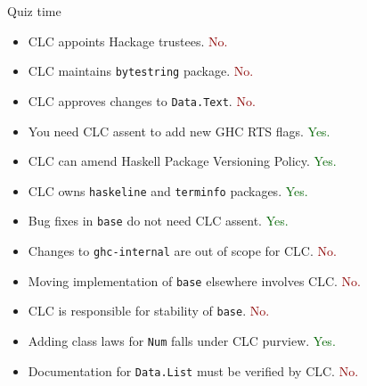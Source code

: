 \documentclass[handout]{beamer}
\begin{document}
\begin{frame}{Quiz time}

\begin{itemize}

\def\yes{\textcolor{darkgreen}{Yes.}}
\def\no{\textcolor{darkred}{No.}}

\item CLC appoints Hackage trustees. \no
\item CLC maintains {\tt bytestring} package. \no
\item CLC approves changes to {\tt Data.Text}. \no
\item You need CLC assent to add new GHC RTS flags. \yes
\item CLC can amend Haskell Package Versioning Policy. \yes
\item CLC owns {\tt haskeline} and {\tt terminfo} packages. \yes
\item Bug fixes in {\tt base} do not need CLC assent. \yes
\item Changes to {\tt ghc-internal} are out of scope for CLC. \no
\item Moving implementation of {\tt base} elsewhere involves CLC. \no
\item CLC is responsible for stability of {\tt base}. \no
\item Adding class laws for {\tt Num} falls under CLC purview. \yes
\item Documentation for {\tt Data.List} must be verified by CLC. \no

\end{itemize}

\end{frame}
\end{document}
